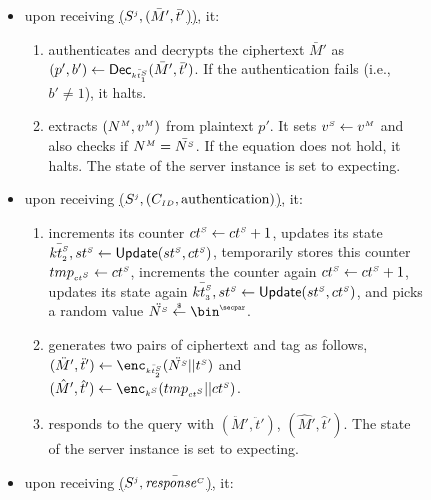 \begin{figure}[H]
\begin{center}
\begin{tcolorbox}[enhanced,width=4.7in, left=0.1cm,
    drop fuzzy shadow southwest,
    colframe=black,colback=white]
{{\begin{itemize}[leftmargin=.4cm]
\begin{enumerate}
 \item responds to the query with $(\bar M,\bar t)$. The state of the server instance is set to ``expecting''.
 \end{enumerate}
 \item upon receiving  \underline{\send($S^{\scriptscriptstyle j}, (\bar M',  \bar t'$))}, it:
 \begin{enumerate}
 \item authenticates and decrypts the ciphertext $\bar M'$ as $(p', b') \gets \mathsf{Dec}_{\scriptscriptstyle\bar{{kt}^{\scriptscriptstyle S}_{\scriptscriptstyle 1}}}(\bar M', \bar t')$. If the authentication fails (i.e., $b'\neq 1$), it halts. 
\item    extracts $({N}^{\scriptscriptstyle M}, {v}^{\scriptscriptstyle M})$ from plaintext $p'$. It sets ${v}^{\scriptscriptstyle S}\gets{v}^{\scriptscriptstyle M}$ and also  checks if ${N}^{\scriptscriptstyle M}=\bar{{N}^{\scriptscriptstyle S}}$. If the equation does not hold, it halts. The state of the server instance is set to expecting.
 \end{enumerate}
 \item upon receiving  \underline{\send($S^{\scriptscriptstyle j}, (C_{\scriptscriptstyle ID},  \text{authentication})$)}, it:
 \begin{enumerate}
  \item  increments its counter  ${ct}^{\scriptscriptstyle S} \gets {ct}^{\scriptscriptstyle S} + 1$, updates its state  $\bar{{kt}^{\scriptscriptstyle S}_{\scriptscriptstyle 2}}, {st}^{\scriptscriptstyle S} \gets \mathsf{Update}({st}^{\scriptscriptstyle S}, {ct}^{\scriptscriptstyle S})$,  temporarily stores this counter ${tmp}_{\scriptscriptstyle{ct}^{\scriptscriptstyle S}} \gets {ct}^{\scriptscriptstyle S}$, increments the counter again ${ct}^{\scriptscriptstyle S} \gets {ct}^{\scriptscriptstyle S} + 1$, updates its state again $\bar{{kt}^{\scriptscriptstyle S}_{\scriptscriptstyle 3}}, {st}^{\scriptscriptstyle S} \gets \mathsf{Update}({st}^{\scriptscriptstyle S}, {ct}^{\scriptscriptstyle S})$, and picks a random value $\ddot{\VS{\nonce}} \stackrel{\sss\$}\leftarrow \bin^{\sss\secpar}$.
  \item generates two pairs of ciphertext and tag as follows, $(\ddot M', \ddot t')\leftarrow \enc_{\sss\bar{\VS{\keyt_{\sss 2}}}}(\ddot{\VS{\nonce}} || \VS{\trans})$ and  $(\hat M', \hat t')\leftarrow \enc_{\sss\VS{k}}(\tmp_{\sss\VS{\counter}} || \VS{\counter})$. 
  \item responds to the query with $(\ddot M', \ddot t')$, $(\hat M', \hat t')$. The state of the server instance is set to expecting.
 \end{enumerate}
 \item upon receiving  \underline{\send($S^{\scriptscriptstyle j},   \bar{\mathit{response}^{\scriptscriptstyle C}}$)}, it:
 \begin{enumerate}

\end{enumerate}
\end{itemize}}}
\end{tcolorbox}
\end{center}
\end{figure}

